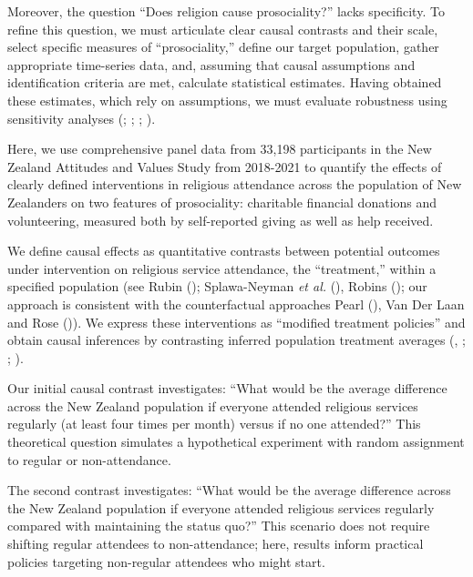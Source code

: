 \documentclass[
  single column]{article}
\begin{document}
Moreover, the question ``Does religion cause prosociality?'' lacks
specificity. To refine this question, we must articulate clear causal
contrasts and their scale, select specific measures of ``prosociality,''
define our target population, gather appropriate time-series data, and,
assuming that causal assumptions and identification criteria are met,
calculate statistical estimates. Having obtained these estimates, which
rely on assumptions, we must evaluate robustness using sensitivity
analyses (;
;
;
).

Here, we use comprehensive panel data from 33,198 participants in the
New Zealand Attitudes and Values Study from 2018-2021 to quantify the
effects of clearly defined interventions in religious attendance across
the population of New Zealanders on two features of prosociality:
charitable financial donations and volunteering, measured both by
self-reported giving as well as help received.

We define causal effects as quantitative contrasts between potential
outcomes under intervention on religious service attendance, the
``treatment,'' within a specified population (see Rubin
(); Splawa-Neyman \emph{et al.}
(), Robins
(); our approach is consistent with the
counterfactual approaches Pearl (), Van
Der Laan and Rose ()). We express
these interventions as ``modified treatment policies'' and obtain causal
inferences by contrasting inferred population treatment averages
(,
;
;
).

Our initial causal contrast investigates: ``What would be the average
difference across the New Zealand population if everyone attended
religious services regularly (at least four times per month) versus if
no one attended?'' This theoretical question simulates a hypothetical
experiment with random assignment to regular or non-attendance.

The second contrast investigates: ``What would be the average difference
across the New Zealand population if everyone attended religious
services regularly compared with maintaining the status quo?'' This
scenario does not require shifting regular attendees to non-attendance;
here, results inform practical policies targeting non-regular attendees
who might start.
\end{document}
